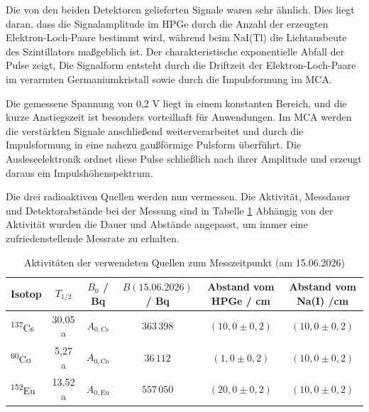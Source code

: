 Die von den beiden Detektoren gelieferten Signale waren sehr ähnlich. Dies liegt daran, dass die Signalamplitude im HPGe durch die Anzahl der erzeugten Elektron‑Loch‑Paare bestimmt wird, während beim NaI(Tl) die Lichtausbeute des Szintillators maßgeblich ist. Der charakteristische exponentielle Abfall der Pulse zeigt, Die Signalform entsteht durch die Driftzeit der Elektron-Loch-Paare im verarmten Germaniumkristall sowie durch die Impulsformung im MCA.

Die gemessene Spannung von 0,2 V liegt in einem konstanten Bereich, und die kurze Anstiegszeit ist besonders vorteilhaft für Anwendungen. Im MCA werden die verstärkten Signale anschließend weiterverarbeitet und durch die
Impulsformung in eine nahezu gaußförmige Pulsform überführt. Die Ausleseelektronik
ordnet diese Pulse schließlich nach ihrer Amplitude und erzeugt daraus ein
Impulshöhenspektrum.

Die drei radioaktiven Quellen werden nun vermessen. Die Aktivität, Messdauer und Detektorabstände bei der Messung sind in Tabelle \ref{tab:quellen} Abhängig von der Aktivität wurden die Dauer und Abstände angepasst, um immer eine zufriedenstellende Messrate zu erhalten.
\begin{table}[H]
\centering
\caption{Aktivitäten der verwendeten Quellen zum Messzeitpunkt (am 15.06.2026)}
\label{tab:quellen}
\begin{tabular}{lccccc}
\hline
Isotop & $T_{1/2}$ & $B_0$ / Bq & $B(15.06.2026)$ / Bq & Abstand vom HPGe / cm & Abstand vom Na(I) /cm \\
\hline
\textsuperscript{137}Cs & 30.05 a & $A_{0,\mathrm{Cs}}$ & $363\,398$ & $(10,0\pm 0,2)$ & $(10,0\pm 0,2)$ \\

\textsuperscript{60}Co & 5,27 a & $A_{0,\mathrm{Co}}$ & $36\,112$ & $(1,0\pm 0,2)$ & $(10,0\pm 0,2)$ \\

\textsuperscript{152}Eu & 13,52 a & $A_{0,\mathrm{Eu}}$ & $557\,050$ & $(20,0\pm 0,2)$ & $(10,0\pm 0,2)$ \\
\hline
\end{tabular}
\end{table}
\label{tab_just1}
